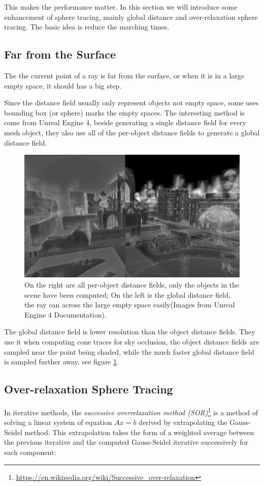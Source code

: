 This makes the performance matter. In this section we will introduce some enhancement of sphere tracing, mainly global distance and over-relaxation sphere tracing. The basic idea is reduce the marching times. 

\subsection{Far from the Surface}
The the current point of a ray is far from the surface, or when it is in a large empty space, it should has a big step. 

Since the distance field usually only represent objects not empty space, some uses bounding box (or sphere) marks the empty spaces. The interesting method is come from Unreal Engine 4, beside generating a single distance field for every mesh object, they also use all of the per-object distance fields to generate a global distance field. 

\begin{figure}\label{f:global-distance-field}
	\includegraphics[width=1.0\textwidth]{graphics/df/DF_GlobalDF}
	\caption{On the right are all per-object distance fields, only the objects in the scene have been computed; On the left is the global distance field, the ray can across the large empty space easily(Images from Unreal Engine 4 Documentation).}
\end{figure}

The global distance field is lower resolution than the object distance fields. They use it when computing cone traces for sky occlusion, the object distance fields are sampled near the point being shaded, while the much faster global distance field is sampled further away. see figure \ref{f:global-distance-field}.

\subsection{Over-relaxation Sphere Tracing}
In iterative methods, the \textit{successive overrelaxation method (SOR)}\footnote{\url{https://en.wikipedia.org/wiki/Successive_over-relaxation}} is a method of solving a linear system of equation $Ax=b$ derived by extrapolating the Gauss-Seidel method. This extrapolation takes the form of a weighted average between the previous iterative and the computed Gauss-Seidel iterative successively for each component:

